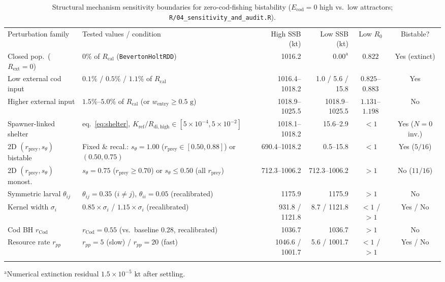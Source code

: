\documentclass[11pt,letterpaper]{article}
\newcommand{\toprule}{\noalign{\hrule height 0.85pt\vspace{2.5pt}}}
\newcommand{\midrule}{\noalign{\vspace{2pt}\hrule height 0.45pt\vspace{2.5pt}}}
\newcommand{\bottomrule}{\noalign{\vspace{2pt}\hrule height 0.85pt}}
\begin{document}
\begin{table}[t!]
\centering
\caption{Structural mechanism sensitivity boundaries for zero-cod-fishing bistability ($E_{\mathrm{cod}} = 0$ high vs.\ low attractors; \texttt{R/04\_sensitivity\_and\_audit.R}).}
\label{tab:sensitivity}
\vspace{0.3em}
{\footnotesize
\setlength{\tabcolsep}{3.2pt}
\begin{tabular}{@{}>{\raggedright\arraybackslash}p{2.65cm}>{\raggedright\arraybackslash}p{4.25cm}rrcc@{}}
\toprule
Perturbation family & Tested values / condition & High SSB (kt) & Low SSB (kt) & Low $R_0$ & Bistable? \\
\midrule
Closed pop.\ ($R_{\mathrm{ext}}=0$) & $0\%$ of $R_{\mathrm{cal}}$ (\texttt{BevertonHoltRDD}) & 1016.2 & $0.00^{\mathrm{a}}$ & $0.822$ & Yes (extinct) \\
Low external cod input & $0.1\%$ / $0.5\%$ / $1.1\%$ of $R_{\mathrm{cal}}$ & 1016.4--1018.2 & 1.0 / 5.6 / 15.8 & $0.825$--$0.883$ & Yes \\
Higher external input & $1.5\%$--$5.0\%$ of $R_{\mathrm{cal}}$ (or $w_{\mathrm{entry}}\ge 0.5\text{ g}$) & 1018.9--1025.5 & 1018.9--1025.5 & $1.131$--$1.198$ & No \\
Spawner-linked shelter & eq.~\eqref{eq:shelter}, $K_{\mathrm{ref}}/R_{\mathrm{di,high}} \in [5\times 10^{-4}, 5\times 10^{-2}]$ & 1018.1--1018.2 & 15.6--2.9 & $< 1$ & Yes ($N=0$ inv.) \\
2D $(r_{\mathrm{prey}}, s_\theta)$ bistable & Fixed \& recal.: $s_\theta = 1.00$ ($r_{\mathrm{prey}}\in[0.50,0.88]$) or $(0.50,0.75)$ & 690.4--1018.2 & 0.5--15.8 & $< 1$ & Yes ($5/16$) \\
2D $(r_{\mathrm{prey}}, s_\theta)$ monost.\ & $s_\theta = 0.75$ ($r_{\mathrm{prey}}\ge 0.70$) or $s_\theta \le 0.50$ (all $r_{\mathrm{prey}}$) & 712.3--1006.2 & 712.3--1006.2 & $> 1$ & No ($11/16$) \\
Symmetric larval $\theta_{ij}$ & $\theta_{ij} = 0.35$ ($i\neq j$), $\theta_{ii} = 0.05$ (recalibrated) & 1175.9 & 1175.9 & $> 1$ & No \\
Kernel width $\sigma_i$ & $0.85\times \sigma_i$ / $1.15\times \sigma_i$ (recalibrated) & 931.8 / 1121.8 & 8.7 / 1121.8 & $<1$ / $>1$ & Yes / No \\
Cod BH $r_{\mathrm{Cod}}$ & $r_{\mathrm{Cod}} = 0.55$ (vs.\ baseline $0.28$, recalibrated) & 1036.7 & 1036.7 & $> 1$ & No \\
Resource rate $r_{pp}$ & $r_{pp} = 5$ (slow) / $r_{pp} = 20$ (fast) & 1046.6 / 1001.7 & 5.6 / 1001.7 & $<1$ / $>1$ & Yes / No \\
\bottomrule
\end{tabular}
\par\vspace{0.25em}
{\scriptsize $^{\mathrm{a}}$Numerical extinction residual $1.5 \times 10^{-5}\text{ kt}$ after settling.}
}
\end{table}
\end{document}
